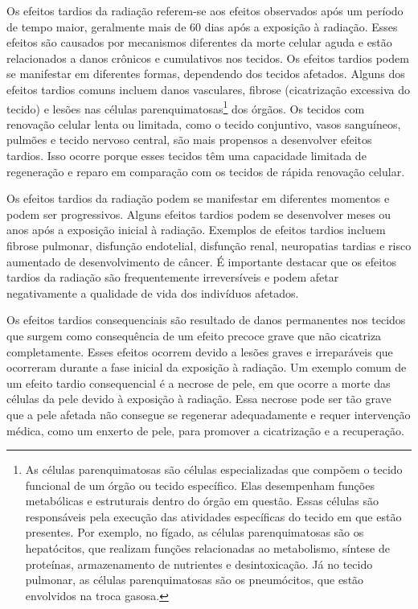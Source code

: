 \documentclass[11pt,a4paper]{article}
\newcounter{exemplo}
\begin{document}
	Os efeitos tardios da radiação referem-se aos efeitos observados após um período de tempo maior, geralmente mais de 60 dias após a exposição à radiação. Esses efeitos são causados por mecanismos diferentes da morte celular aguda e estão relacionados a danos crônicos e cumulativos nos tecidos. Os efeitos tardios podem se manifestar em diferentes formas, dependendo dos tecidos afetados. Alguns dos efeitos tardios comuns incluem danos vasculares, fibrose (cicatrização excessiva do tecido) e lesões nas células parenquimatosas\footnote{As células parenquimatosas são células especializadas que compõem o tecido funcional de um órgão ou tecido específico. Elas desempenham funções metabólicas e estruturais dentro do órgão em questão. Essas células são responsáveis pela execução das atividades específicas do tecido em que estão presentes. Por exemplo, no fígado, as células parenquimatosas são os hepatócitos, que realizam funções relacionadas ao metabolismo, síntese de proteínas, armazenamento de nutrientes e desintoxicação. Já no tecido pulmonar, as células parenquimatosas são os pneumócitos, que estão envolvidos na troca gasosa.} dos órgãos.
	Os tecidos com renovação celular lenta ou limitada, como o tecido conjuntivo, vasos sanguíneos, pulmões e tecido nervoso central, são mais propensos a desenvolver efeitos tardios. Isso ocorre porque esses tecidos têm uma capacidade limitada de regeneração e reparo em comparação com os tecidos de rápida renovação celular.
	
	Os efeitos tardios da radiação podem se manifestar em diferentes momentos e podem ser progressivos. Alguns efeitos tardios podem se desenvolver meses ou anos após a exposição inicial à radiação. Exemplos de efeitos tardios incluem fibrose pulmonar, disfunção endotelial, disfunção renal, neuropatias tardias e risco aumentado de desenvolvimento de câncer.	É importante destacar que os efeitos tardios da radiação são frequentemente irreversíveis e podem afetar negativamente a qualidade de vida dos indivíduos afetados.

	Os efeitos tardios consequenciais são resultado de danos permanentes nos tecidos que surgem como consequência de um efeito precoce grave que não cicatriza completamente. Esses efeitos ocorrem devido a lesões graves e irreparáveis que ocorreram durante a fase inicial da exposição à radiação.	Um exemplo comum de um efeito tardio consequencial é a necrose de pele, em que ocorre a morte das células da pele devido à exposição à radiação. Essa necrose pode ser tão grave que a pele afetada não consegue se regenerar adequadamente e requer intervenção médica, como um enxerto de pele, para promover a cicatrização e a recuperação.
\end{document}
